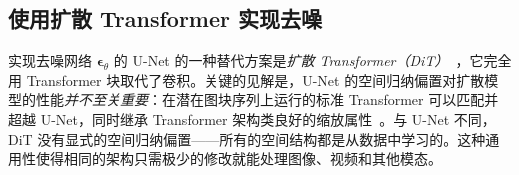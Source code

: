 \documentclass[../../book-main_zh.tex]{subfiles}
\begin{document}







\subsection{使用扩散 Transformer 实现去噪}
\label{sec:DiT-implement}

实现去噪网络 $\boldsymbol{\epsilon}_\theta$ 的 U-Net 的一种替代方案是\textit{扩散 Transformer（DiT）}~\citep{peebles2023scalable}，它完全用 Transformer 块取代了卷积。关键的见解是，U-Net 的空间归纳偏置对扩散模型的性能\emph{并不至关重要}：在潜在图块序列上运行的标准 Transformer 可以匹配并超越 U-Net，同时继承 Transformer 架构类良好的缩放属性~\citep{vaswani2017attention}。与 U-Net 不同，DiT 没有显式的空间归纳偏置——所有的空间结构都是从数据中学习的。这种通用性使得相同的架构只需极少的修改就能处理图像、视频和其他模态。
\end{document}
